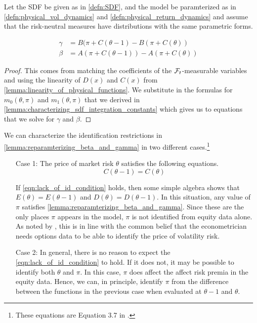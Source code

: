 \documentclass[11pt, letterpaper, twoside]{article}
\begin{document}
\begin{lemma}
    \label{lemma:reparamterizing_beta_and_gamma}
    Let the SDF be given as in \cref{defn:SDF}, and the model be paramterized as in \cref{defn:physical_vol_dynamics} and \cref{defn:physical_return_dynamics} and assume that the risk-neutral measures have distributions with the same parametric forms. 
    
    
    \begin{align}
        \label{eqn:beta_function}
        \gamma &= B(\pi + C(\theta - 1) - B(\pi + C(\theta)) \\
        \label{eqn:gamma_function}
        \beta &= A(\pi + C(\theta -1)) - A(\pi + C(\theta)) 
    \end{align}
    
\end{lemma}

\begin{proof}
    This comes from matching the coefficients of the $\mathcal{F}_t$-measurable variables and using the linearity of $D(x)$ and $C(x)$ from \cref{lemma:linearity_of_physical_functions}.  We substitute in the formulas for $m_0(\theta, \pi)$ and $m_1(\theta, \pi)$ that we derived in \cref{lemma:characterizing_sdf_integration_constants} which gives us to equations that we solve for $\gamma$ and $\beta$.
\end{proof}
 
We can characterize the identification restrictions in \cref{lemma:reparamterizing_beta_and_gamma} in two different cases.\footnote{These equations are Equation 3.7 in \textcite{han2018leverage}.}

\begin{enumerate}
    \item[Case 1:] The price of market risk $\theta$ satisfies the following equations. 
        \begin{equation}
            \label{eqn:lack_of_id_condition}
            C(\theta - 1) = C(\theta) 
        \end{equation}
    
        If \cref{eqn:lack_of_id_condition} holds, then some simple algebra shows that $E(\theta) = E(\theta-1)$ and $D(\theta) = D(\theta-1)$.  In this situation, any value of $\pi$ satisfies \cref{lemma:reparamterizing_beta_and_gamma}.  Since these are the only places $\pi$ appears in the model, $\pi$ is not identified from equity data alone.  As noted by \textcite{han2018leverage}, this is in line with the common belief that the econometrician needs options data to be able to identify the price of volatility risk. 
    
    \item[Case 2:] 
        In general, there is no reason to expect the \cref{eqn:lack_of_id_condition} to hold.  If it does not, it may be possible to identify both $\theta$ and $\pi$.  In this case, $\pi$ does affect the affect risk premia in the equity data. Hence, we can, in principle, identify $\pi$ from the difference between the functions in the previous case when evaluated at $\theta-1$ and $\theta$.  
\end{enumerate}
\end{document}
